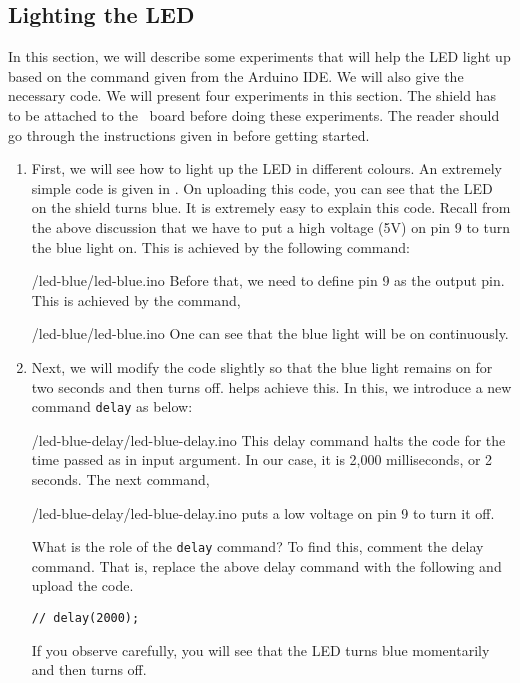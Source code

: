 \subsection{Lighting the LED}
\label{sec:light-ard}
In this section, we will describe some experiments that will help the
LED light up based on the command given from the Arduino IDE.  We will
also give the necessary code.  We will present four experiments in
this section.  The shield has to be attached to the \arduino\ board
before doing these experiments.  The reader should go through the
instructions given in  before getting started.
\begin{enumerate}
\item First, we will see how to light up the LED in different
colours.  An extremely simple code is given in .
On uploading this code, you can see that the LED on the shield turns
blue.  It is extremely easy to explain this code.  Recall from the
above discussion that we have to put a high voltage (5V) on pin 9 to
turn the blue light on.  This is achieved by the following command:

{\LocLEDardcode/led-blue/led-blue.ino}
Before that, we need to define pin 9 as the
output pin.  This is achieved by the command,

{\LocLEDardcode/led-blue/led-blue.ino}
One can see that the blue light will be on continuously.  

\item Next, we will modify the code slightly so that the blue light
  remains on for two seconds and then turns off.
   helps achieve this.  In this, we
  introduce a new command {\tt delay} as below:
  
  {\LocLEDardcode/led-blue-delay/led-blue-delay.ino} This delay
  command halts the code for the time passed as in input argument. In
  our case, it is 2,000 milliseconds, or 2 seconds.  The next command,
  
  {\LocLEDardcode/led-blue-delay/led-blue-delay.ino} puts a low
  voltage on pin 9 to turn it off.

  What is the role of the {\tt delay} command?  To find this,
  comment the delay command.  That is, replace the above delay command
  with the following and upload the code.
  \begin{lstlisting}[style=nonumbers]
    // delay(2000);
  \end{lstlisting}
  If you observe carefully, you will see that the LED turns blue
  momentarily and then turns off.
 

\end{enumerate}
